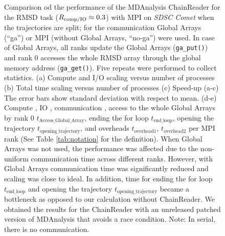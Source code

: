 \begin{figure}[ht!]
\caption{Comparison od the performance of the MDAnalysis ChainReader for the RMSD task ($R_{\text{comp/IO}} \approx 0.3$)  with MPI on \emph{SDSC Comet} when the trajectories are split; for the communication Global Arrays (``ga'') or MPI (without Global Arrays, ``no-ga'') were used.
In case of Global Arrays, all ranks update the Global Arrays (\texttt{ga\_put()}) and rank 0 accesses the whole RMSD array through the global memory address (\texttt{ga\_get()}).
Five repeats were performed to collect statistics. (a) Compute and I/O scaling versus number of processes (b) Total time scaling versus number of processes (c) Speed-up (a-c) The error bars show standard deviation with respect to mean. (d-e) Compute \tcomp, IO \tIO, communication \tcomm, access to the whole Global Arrays by rank 0 $t_{\text{Access\_Global\_Array}}$, ending the for loop $t_{\text{end\_loop}}$,
  opening the trajectory $t_{\text{opening\_trajectory}}$, and overheads $t_{\text{overhead1}}$, $t_{\text{overhead2}}$ per MPI rank (See Table \ref{tab:notation} for the definition). When Global Arrays was not used, the performance was affected due to the non-uniform communication time across different ranks. However, with Global Arrays communication time was significantly reduced and scaling was close to ideal. In addition, time for ending the for loop $t_{\text{end\_loop}}$ and 
opening the trajectory $t_{\text{opening\_trajectory}}$ became a bottleneck as opposed to our calculation without ChainReader. We obtained the results for the ChainReader with an unreleased patched version of MDAnalysis that avoids a race condition. Note: In serial, there is no communication.}
\label{fig:MPIwithIO-split-chain-reader}
\end{figure}

